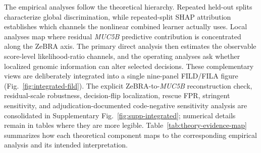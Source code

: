 The empirical analyses follow the theoretical hierarchy. Repeated held-out splits characterize global discrimination, while repeated-split SHAP attribution establishes which channels the nonlinear combined learner actually uses. Local analyses map where residual \textit{MUC5B} predictive contribution is concentrated along the ZeBRA axis. The primary direct analysis then estimates the observable score-level likelihood-ratio channels, and the operating analyses ask whether localized genomic information can alter selected decisions. These complementary views are deliberately integrated into a single nine-panel FILD/FILA figure (Fig.~\ref{fig:integrated-fild}). The explicit ZeBRA-to-\textit{MUC5B} reconstruction check, residual-scale robustness, decision-flip localization, rescue FPR, stringent sensitivity, and adjudication-documented code-negative sensitivity analysis are consolidated in Supplementary Fig.~\ref{fig:supp-integrated}; numerical details remain in tables where they are more legible. Table~\ref{tab:theory-evidence-map} summarizes how each theoretical component maps to the corresponding empirical analysis and its intended interpretation.

